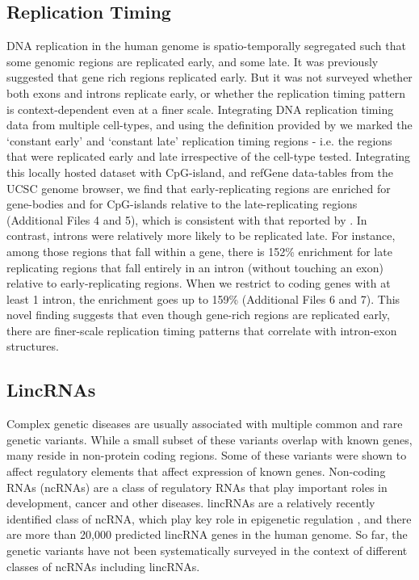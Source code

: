 \documentclass[10pt]{bmc_article}
\newenvironment{bmcformat}{\baselineskip20pt\sloppy\setboolean{publ}{false}}{\baselineskip20pt\sloppy}
\begin{document}
\begin{bmcformat}
\subsection*{Replication Timing}
DNA replication in the human genome is spatio-temporally segregated such that some genomic regions are replicated early, and some late. It was previously suggested that gene rich regions replicated early. But it was not surveyed whether both exons and introns replicate early, or whether the replication timing pattern is context-dependent even at a finer scale. Integrating DNA replication timing data from multiple cell-types, and using the definition provided by \cite{Hansen} we marked the ‘constant early’ and ‘constant late’ replication timing regions - i.e. the regions that were replicated early and late irrespective of the cell-type tested. Integrating this locally hosted dataset with CpG-island, and refGene data-tables from the UCSC genome browser, we find  that early-replicating regions are enriched for gene-bodies and for CpG-islands relative to the late-replicating regions (Additional Files 4 and 5), which is consistent with that reported by \cite{Hansen}. In contrast, introns were relatively more likely to be replicated late. For instance, among those regions that fall within a gene, there is 152\% enrichment for late replicating regions that fall entirely in an intron (without touching an exon) relative to early-replicating regions. When we restrict to coding genes with at least 1 intron, the enrichment goes up to 159\% (Additional Files 6 and 7). This novel finding suggests that even though gene-rich regions are replicated early, there are finer-scale replication timing patterns that correlate with intron-exon structures.

\subsection*{LincRNAs}
Complex genetic diseases are usually associated with multiple common and rare genetic variants. While a small subset of these variants overlap with known genes, many reside in non-protein coding regions. Some of these variants were shown to affect regulatory elements that affect expression of known genes. Non-coding RNAs (ncRNAs) are a class of regulatory RNAs that play important roles in development, cancer and other diseases. lincRNAs are a relatively recently identified class of ncRNA, which play key role in epigenetic regulation \cite{Lee}, and there are more than 20,000 predicted lincRNA genes in the human genome. So far, the genetic variants have not been systematically surveyed in the context of different classes of ncRNAs including lincRNAs. 


\end{bmcformat}
\end{document}
